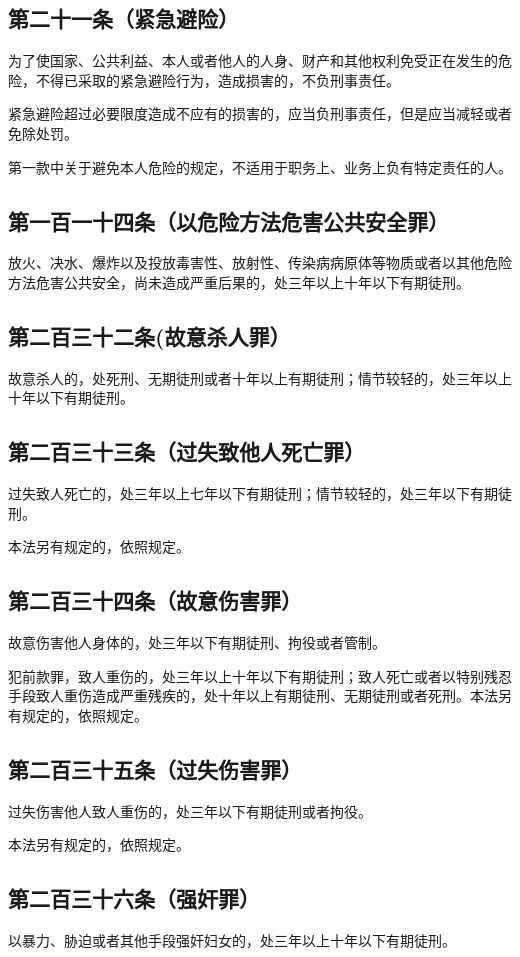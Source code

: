 \documentclass[utf-8,10pt]{ctexart}
\begin{document}
\subsection{第二十一条（紧急避险）}
为了使国家、公共利益、本人或者他人的人身、财产和其他权利免受正在发生的危险，不得已采取的紧急避险行为，造成损害的，不负刑事责任。

紧急避险超过必要限度造成不应有的损害的，应当负刑事责任，但是应当减轻或者免除处罚。

第一款中关于避免本人危险的规定，不适用于职务上、业务上负有特定责任的人。
\subsection{第一百一十四条（以危险方法危害公共安全罪）}
放火、决水、爆炸以及投放毒害性、放射性、传染病病原体等物质或者以其他危险方法危害公共安全，尚未造成严重后果的，处三年以上十年以下有期徒刑。
\subsection{第二百三十二条(故意杀人罪）}
故意杀人的，处死刑、无期徒刑或者十年以上有期徒刑；情节较轻的，处三年以上十年以下有期徒刑。
\subsection{第二百三十三条（过失致他人死亡罪）}
过失致人死亡的，处三年以上七年以下有期徒刑；情节较轻的，处三年以下有期徒刑。

本法另有规定的，依照规定。
\subsection{第二百三十四条（故意伤害罪）}
故意伤害他人身体的，处三年以下有期徒刑、拘役或者管制。

犯前款罪，致人重伤的，处三年以上十年以下有期徒刑；致人死亡或者以特别残忍手段致人重伤造成严重残疾的，处十年以上有期徒刑、无期徒刑或者死刑。本法另有规定的，依照规定。
\subsection{第二百三十五条（过失伤害罪）}
过失伤害他人致人重伤的，处三年以下有期徒刑或者拘役。

本法另有规定的，依照规定。
\subsection{第二百三十六条（强奸罪）}
以暴力、胁迫或者其他手段强奸妇女的，处三年以上十年以下有期徒刑。
\end{document}
